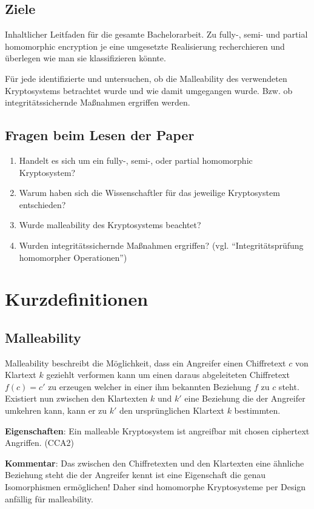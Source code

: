 \documentclass[12pt,a4paper]{scrartcl}				%
\begin{document}
\subsection*{Ziele}	
Inhaltlicher Leitfaden für die gesamte Bachelorarbeit. Zu fully-, semi- und partial homomorphic encryption je eine umgesetzte Realisierung recherchieren und überlegen wie man sie klassifizieren könnte.

Für jede identifizierte und untersuchen, ob die Malleability des verwendeten Kryptosystems betrachtet wurde und wie damit umgegangen wurde. Bzw. ob integritätssichernde Maßnahmen ergriffen werden.	
	
\subsection*{Fragen beim Lesen der Paper}
\begin{enumerate}
	\item Handelt es sich um ein fully-, semi-, oder partial homomorphic Kryptosystem?
	\item Warum haben sich die Wissenschaftler für das jeweilige Kryptosystem entschieden?
	\item Wurde malleability des Kryptosystems beachtet?
	\item Wurden integritätssichernde Maßnahmen ergriffen? (vgl. \enquote{Integritätsprüfung homomorpher Operationen})
\end{enumerate}
\newpage

\section*{Kurzdefinitionen}
\subsection*{Malleability}
Malleability beschreibt die Möglichkeit, dass ein Angreifer einen Chiffretext $c$ von Klartext $k$ geziehlt verformen kann um einen daraus abgeleiteten Chiffretext $f(c)=c'$ zu erzeugen welcher in einer ihm bekannten Beziehung $f$ zu $c$ steht. Existiert nun zwischen den Klartexten $k$ und $k'$ eine Beziehung die der Angreifer umkehren kann, kann er zu $k'$ den ursprünglichen Klartext $k$ bestimmten. \cite[p. 292]{smart2003}

\textbf{Eigenschaften}: Ein malleable Kryptosystem ist angreifbar mit chosen ciphertext Angriffen. (CCA2)

\textbf{Kommentar}: Das zwischen den Chiffretexten und den Klartexten eine ähnliche Beziehung steht die der Angreifer kennt ist eine Eigenschaft die genau Isomorphismen ermöglichen! Daher sind homomorphe Kryptosysteme per Design anfällig für malleability.
\end{document}
